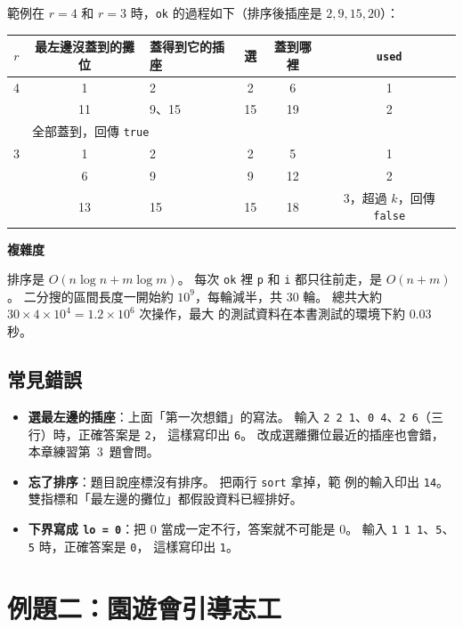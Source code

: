 範例在 $r = 4$ 和 $r = 3$ 時，\texttt{ok} 的過程如下（排序後插座是
$2, 9, 15, 20$）：

\begin{center}
\begin{tabular}{cclccc}
\toprule
$r$ & 最左邊沒蓋到的攤位 & 蓋得到它的插座 & 選 & 蓋到哪裡 & \texttt{used} \\
\midrule
4 & 1 & 2 & 2 & 6 & 1 \\
  & 11 & 9、15 & 15 & 19 & 2 \\
  & \multicolumn{5}{l}{全部蓋到，回傳 \texttt{true}} \\
\midrule
3 & 1 & 2 & 2 & 5 & 1 \\
  & 6 & 9 & 9 & 12 & 2 \\
  & 13 & 15 & 15 & 18 & 3，超過 $k$，回傳 \texttt{false} \\
\bottomrule
\end{tabular}
\end{center}

\textbf{複雜度}

排序是 $O(n \log n + m \log m)$。 每次 \texttt{ok} 裡 \texttt{p} 和 \texttt{i}
都只往前走，是 $O(n + m)$。 二分搜的區間長度一開始約 $10^9$，每輪減半，共
$30$ 輪。 總共大約 $30 \times 4 \times 10^4 = 1.2 \times 10^6$ 次操作，最大
的測試資料在本書測試的環境下約 $0.03$ 秒。

\subsection{常見錯誤}

\begin{itemize}
\item \textbf{選最左邊的插座}：上面「第一次想錯」的寫法。 輸入
\texttt{2 2 1}、\texttt{0 4}、\texttt{2 6}（三行）時，正確答案是 \texttt{2}，
這樣寫印出 \texttt{6}。 改成選離攤位最近的插座也會錯，本章練習第~3~題會問。
\item \textbf{忘了排序}：題目說座標沒有排序。 把兩行 \texttt{sort} 拿掉，範
例的輸入印出 \texttt{14}。 雙指標和「最左邊的攤位」都假設資料已經排好。
\item \textbf{下界寫成 \texttt{lo = 0}}：把 $0$ 當成一定不行，答案就不可能是
$0$。 輸入 \texttt{1 1 1}、\texttt{5}、\texttt{5} 時，正確答案是 \texttt{0}，
這樣寫印出 \texttt{1}。
\end{itemize}

\section{例題二：園遊會引導志工}
\label{sec:cap-guides}

